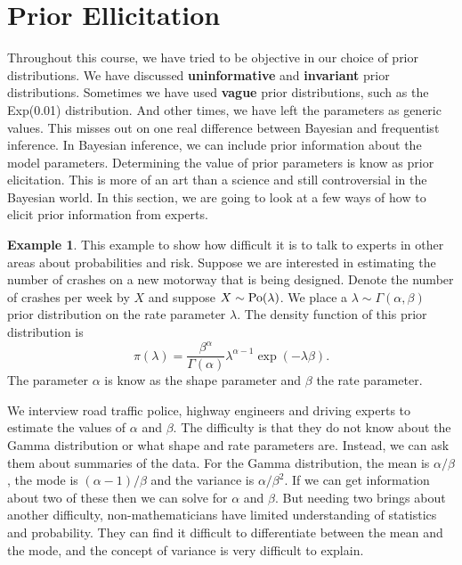 \documentclass[
]{book}
\theoremstyle{definition}
\theoremstyle{definition}
\newtheorem{example}{Example}[chapter]
\theoremstyle{definition}
\theoremstyle{definition}
\theoremstyle{remark}
\begin{document}
\section{Prior Ellicitation}\label{prior-ellicitation}

Throughout this course, we have tried to be objective in our choice of prior distributions. We have discussed \textbf{uninformative} and \textbf{invariant} prior distributions. Sometimes we have used \textbf{vague} prior distributions, such as the Exp(0.01) distribution. And other times, we have left the parameters as generic values. This misses out on one real difference between Bayesian and frequentist inference. In Bayesian inference, we can include prior information about the model parameters. Determining the value of prior parameters is know as prior elicitation. This is more of an art than a science and still controversial in the Bayesian world. In this section, we are going to look at a few ways of how to elicit prior information from experts.

\begin{example}
This example to show how difficult it is to talk to experts in other areas about probabilities and risk. Suppose we are interested in estimating the number of crashes on a new motorway that is being designed. Denote the number of crashes per week by \(X\) and suppose \(X \sim \hbox{Po}(\lambda)\). We place a \(\lambda \sim \Gamma(\alpha, \beta)\) prior distribution on the rate parameter \(\lambda\). The density function of this prior distribution is
\[
\pi(\lambda) = \frac{\beta^\alpha}{\Gamma(\alpha)}\lambda^{\alpha-1}\exp(-\lambda\beta). 
\]
The parameter \(\alpha\) is know as the shape parameter and \(\beta\) the rate parameter.

We interview road traffic police, highway engineers and driving experts to estimate the values of \(\alpha\) and \(\beta\). The difficulty is that they do not know about the Gamma distribution or what shape and rate parameters are. Instead, we can ask them about summaries of the data. For the Gamma distribution, the mean is \(\alpha/\beta\), the mode is \((\alpha - 1)/\beta\) and the variance is \(\alpha/\beta^2\). If we can get information about two of these then we can solve for \(\alpha\) and \(\beta\). But needing two brings about another difficulty, non-mathematicians have limited understanding of statistics and probability. They can find it difficult to differentiate between the mean and the mode, and the concept of variance is very difficult to explain.
\end{example}
\end{document}
